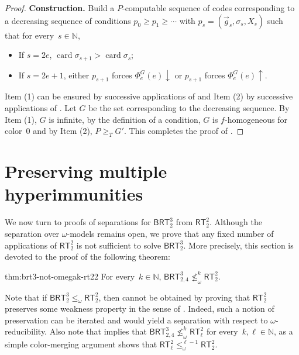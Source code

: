 \documentclass{article}
\newcommand{\converge}{\!\!\downarrow}
\newcommand{\diverge}{\!\!\uparrow}
\newcommand{\RT}[0]{\mathsf{RT}}
\newcommand{\BRT}[0]{\mathsf{BRT}}
\newcommand{\NN}[0]{\mathbb{N}}
\newcommand{\card}{\operatorname{card}}
\numberwithin{theorem}{section}
\begin{document}
\begin{proof}
\noindent
\textbf{Construction.} Build a $P$-computable sequence of codes corresponding to a decreasing sequence of conditions $p_0 \geq p_1 \geq \cdots$ with $p_s = (\vec{g}_s, \sigma_s, X_s)$ such that for every~$s \in \NN$,
\begin{itemize}
    \item[(1)] If $s = 2e$, $\card \sigma_{s+1} > \card \sigma_s$;
    \item[(2)] If $s = 2e+1$, either $p_{s+1}$ forces $\Phi^G_e(e)\converge$ or $p_{s+1}$ forces $\Phi^G_e(e)\diverge$.
\end{itemize}
Item (1) can be ensured by successive applications of  and Item (2) by successive applications of .
Let $G$ be the set corresponding to the decreasing sequence. By Item (1), $G$ is infinite, by the definition of a condition, $G$ is $f$-homogeneous for color~0 and by Item (2), $P \geq_T G'$.
This completes the proof of .
\end{proof}


\section{Preserving multiple hyperimmunities}

We now turn to proofs of separations for $\BRT^3_2$ from $\RT^2_2$. Although the separation over $\omega$-models remains open, we prove that any fixed number of applications of $\RT^2_2$ is not sufficient to solve $\BRT^3_2$. More precisely, this section is devoted to the proof of the following theorem:

\begin{reptheorem}{thm:brt3-not-omegak-rt22}
For every~$k \in \NN$, $\BRT^3_{2,4} \not \leq_\omega^k \RT^2_2$.
\end{reptheorem}

Note that if $\BRT^3_2 \leq_\omega \RT^2_2$, then  cannot be obtained by proving that $\RT^2_2$ preserves some weakness property in the sense of . Indeed, such a notion of preservation can be iterated and would yield a separation with respect to $\omega$-reducibility.  Also note that  implies that $\BRT^3_{2,4} \not \leq_\omega^k \RT^2_\ell$ for every~$k, \ell \in \NN$, as a simple color-merging argument shows that $\RT^2_\ell \leq_\omega^{\ell-1} \RT^2_2$.
\end{document}
